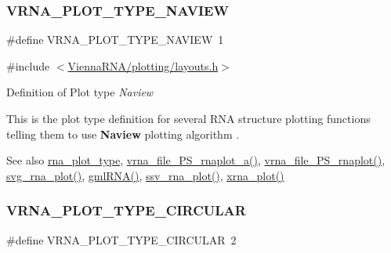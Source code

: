 \subsubsection{\texorpdfstring{VRNA\_PLOT\_TYPE\_NAVIEW}{VRNA\_PLOT\_TYPE\_NAVIEW}}
{\footnotesize\ttfamily \#define V\+R\+N\+A\+\_\+\+P\+L\+O\+T\+\_\+\+T\+Y\+P\+E\+\_\+\+N\+A\+V\+I\+EW~1}



{\ttfamily \#include $<$\mbox{\hyperlink{layouts_8h}{Vienna\+R\+N\+A/plotting/layouts.\+h}}$>$}



Definition of Plot type {\itshape Naview} 

This is the plot type definition for several R\+NA structure plotting functions telling them to use {\bfseries{Naview}} plotting algorithm \cite{bruccoleri:1988}.

\begin{DoxySeeAlso}{See also}
\mbox{\hyperlink{group__plotting__utils__deprecated_ga5964c4581431b098b80027d6e14dcdd4}{rna\+\_\+plot\+\_\+type}}, \mbox{\hyperlink{group__plotting__utils_ga139a31dd0ba9fc6612431f67de901c31}{vrna\+\_\+file\+\_\+\+P\+S\+\_\+rnaplot\+\_\+a()}}, \mbox{\hyperlink{group__plotting__utils_gabdc8f6548ba4a3bc3cd868ccbcfdb86a}{vrna\+\_\+file\+\_\+\+P\+S\+\_\+rnaplot()}}, \mbox{\hyperlink{group__plotting__utils_gae7853539b5df98f294b4af434e979304}{svg\+\_\+rna\+\_\+plot()}}, \mbox{\hyperlink{group__plotting__utils_ga70834bc8c0aad4fe6824ff76ccb8f329}{gml\+R\+N\+A()}}, \mbox{\hyperlink{group__plotting__utils_gadd368528755f9a830727b680243541df}{ssv\+\_\+rna\+\_\+plot()}}, \mbox{\hyperlink{group__plotting__utils_ga2f6d5953e6a323df898896b8d6614483}{xrna\+\_\+plot()}} 
\end{DoxySeeAlso}
\mbox{\label{group__plot__layout__utils_ga8c9eac631348da92136c8363ecdd9fb9}} 
\subsubsection{\texorpdfstring{VRNA\_PLOT\_TYPE\_CIRCULAR}{VRNA\_PLOT\_TYPE\_CIRCULAR}}
{\footnotesize\ttfamily \#define V\+R\+N\+A\+\_\+\+P\+L\+O\+T\+\_\+\+T\+Y\+P\+E\+\_\+\+C\+I\+R\+C\+U\+L\+AR~2}



